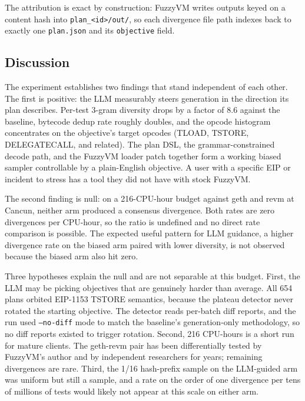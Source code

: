 \documentclass[conference]{IEEEtran}
\begin{document}
The attribution is exact by construction: FuzzyVM writes outputs keyed on a content hash into \texttt{plan\_<id>/out/}, so each divergence file path indexes back to exactly one \texttt{plan.json} and its \texttt{objective} field.

\subsection{Discussion}

The experiment establishes two findings that stand independent of each other. The first is positive: the LLM measurably steers generation in the direction its plan describes. Per-test 3-gram diversity drops by a factor of 8.6 against the baseline, bytecode dedup rate roughly doubles, and the opcode histogram concentrates on the objective's target opcodes (TLOAD, TSTORE, DELEGATECALL, and related). The plan DSL, the grammar-constrained decode path, and the FuzzyVM loader patch together form a working biased sampler controllable by a plain-English objective. A user with a specific EIP or incident to stress has a tool they did not have with stock FuzzyVM.

The second finding is null: on a 216-CPU-hour budget against geth and revm at Cancun, neither arm produced a consensus divergence. Both rates are zero divergences per CPU-hour, so the ratio is undefined and no direct rate comparison is possible. The expected useful pattern for LLM guidance, a higher divergence rate on the biased arm paired with lower diversity, is not observed because the biased arm also hit zero.

Three hypotheses explain the null and are not separable at this budget. First, the LLM may be picking objectives that are genuinely harder than average. All 654 plans orbited EIP-1153 TSTORE semantics, because the plateau detector never rotated the starting objective. The detector reads per-batch diff reports, and the run used \texttt{--no-diff} mode to match the baseline's generation-only methodology, so no diff reports existed to trigger rotation. Second, 216 CPU-hours is a short run for mature clients. The geth-revm pair has been differentially tested by FuzzyVM's author and by independent researchers for years; remaining divergences are rare. Third, the 1/16 hash-prefix sample on the LLM-guided arm was uniform but still a sample, and a rate on the order of one divergence per tens of millions of tests would likely not appear at this scale on either arm.
\end{document}
